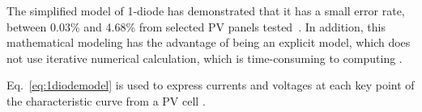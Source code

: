 \documentclass[journal]{IEEEtran}
\begin{document}
The simplified model of 1-diode has demonstrated that it has a small error rate, between 0.03\% and 4.68\% from selected PV panels tested~\cite{Saloux}. In addition, this mathematical modeling has the advantage of being an explicit model, which does not use iterative numerical calculation, which is time-consuming to computing \cite{Cubas}. 
 
%
Eq.~\eqref{eq:1diodemodel} is used to express currents and voltages at each key point of the characteristic curve from a PV cell \cite{Villalva}.
%
%
%
%
%
%
%
\end{document}
